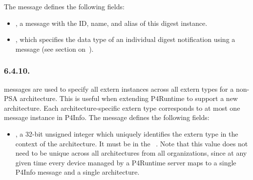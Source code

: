 \documentclass[11pt]{article}
\begin{document}
{%
The  message defines the following fields:%

\begin{itemize}%

\item{}
, a  message with the ID, name, and alias of this digest
instance.%

\item{}
, which specifies the data type of an individual digest
notification using a  message (see section on~).%
\end{itemize}%

\subsubsection{6.4.10.\hspace*{0.5em}}\label{sec-p4info-extern}%

\noindent{} messages are used to specify all extern instances across all extern
types for a non-PSA architecture. This is useful when extending P4Runtime to
support a new architecture. Each architecture-specific extern type corresponds
to at most one  message instance in P4Info. The  message defines
the following fields:%

\begin{itemize}%

\item{}
, a 32-bit unsigned integer which uniquely identifies the
extern type in the context of the architecture. It must be in the~ . Note that this value does not need
to be unique across all architectures from all organizations, since at any
given time every device managed by a P4Runtime server maps to a single P4Info
message and a single architecture.%


\end{itemize}}
\end{document}

